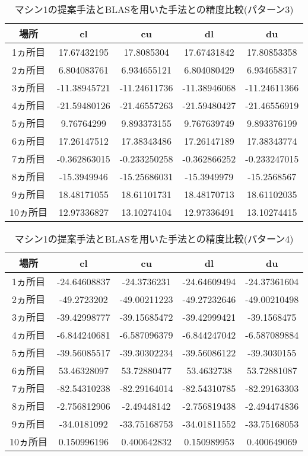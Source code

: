 \documentclass[11pt,a4paper]{jsreport}
\theoremstyle{definition}
\begin{document}
\begin{table}[H]
\centering
\begin{tabular}{|c|c|c|c|c|}
\hline
場所 & cl & cu & dl & du \\ \hline
1ヵ所目 & 17.67432195 & 17.8085304 & 17.67431842 & 17.80853358 \\ \hline
2ヵ所目 & 6.804083761 & 6.934655121 & 6.804080429 & 6.934658317 \\ \hline
3ヵ所目 & -11.38945721 & -11.24611736 & -11.38946068 & -11.24611366 \\ \hline
4ヵ所目 & -21.59480126 & -21.46557263 & -21.59480427 & -21.46556919 \\ \hline
5ヵ所目 & 9.76764299 & 9.893373155 & 9.767639749 & 9.893376199 \\ \hline
6ヵ所目 & 17.26147512 & 17.38343486 & 17.26147189 & 17.38343774 \\ \hline
7ヵ所目 & -0.362863015 & -0.233250258 & -0.362866252 & -0.233247015 \\ \hline
8ヵ所目 & -15.3949946 & -15.25686031 & -15.3949979 & -15.2568567 \\ \hline
9ヵ所目 & 18.48171055 & 18.61101731 & 18.48170713 & 18.61102035 \\ \hline
10ヵ所目 & 12.97336827 & 13.10274104 & 12.97336491 & 13.10274415 \\ \hline
\end{tabular}
\caption{マシン1の提案手法とBLASを用いた手法との精度比較(パターン3)}
\end{table}

\begin{table}[H]
\centering
\begin{tabular}{|c|c|c|c|c|}
\hline
場所 & cl & cu & dl & du \\ \hline
1ヵ所目 & -24.64608837 & -24.3736231 & -24.64609494 & -24.37361604 \\ \hline
2ヵ所目 & -49.2723202 & -49.00211223 & -49.27232646 & -49.00210498 \\ \hline
3ヵ所目 & -39.42998777 & -39.15685472 & -39.42999421 & -39.1568475 \\ \hline
4ヵ所目 & -6.844240681 & -6.587096379 & -6.844247042 & -6.587089884 \\ \hline
5ヵ所目 & -39.56085517 & -39.30302234 & -39.56086122 & -39.3030155 \\ \hline
6ヵ所目 & 53.46328097 & 53.72880477 & 53.4632738 & 53.72881087 \\ \hline
7ヵ所目 & -82.54310238 & -82.29164014 & -82.54310785 & -82.29163303 \\ \hline
8ヵ所目 & -2.756812906 & -2.49448142 & -2.756819438 & -2.494474836 \\ \hline
9ヵ所目 & -34.0181092 & -33.75168753 & -34.01811552 & -33.75168053 \\ \hline
10ヵ所目 & 0.150996196 & 0.400642832 & 0.150989953 & 0.400649069 \\ \hline
\end{tabular}
\caption{マシン1の提案手法とBLASを用いた手法との精度比較(パターン4)}
\end{table}
\end{document}
